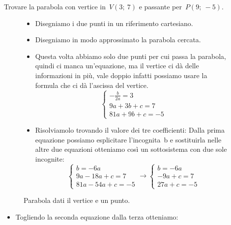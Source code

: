 \begin{esempio}
 Trovare la parabola con vertice in~$V(3;~7)$ e passante per~$P(9;~-5)$.
 
\begin{figure}[h]
\begin{minipage}{.60\textwidth}
 \begin{itemize}
  \item Disegniamo i due punti in un riferimento cartesiano.
  \item Disegniamo in modo approssimato la parabola cercata.
  \item Questa volta abbiamo solo due punti per cui passa la parabola, quindi
   ci manca un'equazione, ma il vertice ci dà delle informazioni in più, 
   vale doppio infatti possiamo usare la formula che ci dà l'ascissa del 
   vertice.
\[\left\{\begin{array}{l}
  -\frac{b}{2a}=3\\
  9a+3b+c=7\\
  81a+9b+c=-5
\end{array}\right. \]
  \item Risolviamolo trovando il valore dei tre coefficienti:
   Dalla prima equazione possiamo esplicitare l'incognita~b e sostituirla
   nelle altre due equazioni otteniamo così un sottosistema con due sole 
   incognite:
\[\left\{\begin{array}{l}
  b=-6a \\
  9a-18a+c=7\\
  81a-54a+c=-5
\end{array}\right. \rightarrow 
\left\{\begin{array}{l}
  b=-6a \\
  -9a+c=7\\
  27a+c=-5
\end{array}\right.\]
 \end{itemize}

\end{minipage}
\begin{minipage}{.40\textwidth}
\begin{inaccessibleblock}[Parabola di equazione $y=x^2$.]
\centering
  \parabolaverticepunto
  \caption{Parabola dati il vertice e un punto.} 
\label{fig:parabola_parabolaverticepunto}
\end{inaccessibleblock}
\end{minipage}
\end{figure}

  \begin{itemize}
  \item Togliendo la seconda equazione dalla terza otteniamo: 


\end{itemize}
\end{esempio}
